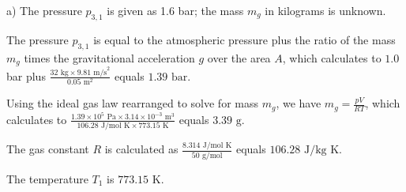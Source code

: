 a) The pressure \( p_{3,1} \) is given as 1.6 bar; the mass \( m_g \) in kilograms is unknown.

The pressure \( p_{3,1} \) is equal to the atmospheric pressure plus the ratio of the mass \( m_g \) times the gravitational acceleration \( g \) over the area \( A \), which calculates to \( 1.0 \) bar plus \( \frac{32 \text{ kg} \times 9.81 \text{ m/s}^2}{0.05 \text{ m}^2} \) equals \( 1.39 \text{ bar} \).

Using the ideal gas law rearranged to solve for mass \( m_g \), we have \( m_g = \frac{pV}{RT} \), which calculates to \( \frac{1.39 \times 10^5 \text{ Pa} \times 3.14 \times 10^{-3} \text{ m}^3}{106.28 \text{ J/mol K} \times 773.15 \text{ K}} \) equals \( 3.39 \text{ g} \).

The gas constant \( R \) is calculated as \( \frac{8.314 \text{ J/mol K}}{50 \text{ g/mol}} \) equals \( 106.28 \text{ J/kg K} \).

The temperature \( T_1 \) is \( 773.15 \text{ K} \).